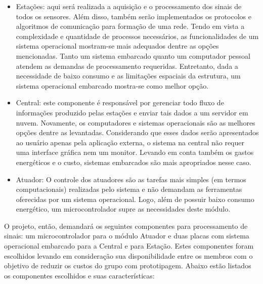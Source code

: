 		\begin{itemize}
			\item Estações: aqui será realizada a aquisição e o processamento dos sinais de todos os sensores. Além disso, também serão implementados os protocolos e algoritmos de comunicação para formação de uma rede. Tendo em vista a complexidade e quantidade de processos necessários, as funcionalidades de um sistema operacional mostram-se mais adequados dentre as opções mencionadas. Tanto um sistema embarcado quanto um computador pessoal atendem as demandas de processamento requeridas. Entretanto, dada a necessidade de baixo consumo e as limitações espaciais da estrutura, um sistema operacional embarcado mostra-se como melhor opção.   
			
			\item Central: este componente é responsável por gerenciar todo fluxo de informações produzido pelas estações e enviar tais dados a um servidor em nuvem. Novamente, os computadores e sistemas operacionais são as melhores opções dentre as levantadas. Considerando que esses dados serão apresentados ao usuário apenas pela aplicação externa, o sistema na central não requer uma interface gráfica nem um monitor. Levando em conta também os gastos energéticos e o custo, sistemas embarcados são mais apropriados nesse caso.
			
			\item Atuador: O controle dos atuadores são as tarefas mais simples (em termos computacionais) realizadas pelo sistema e não demandam as ferramentas oferecidas por um sistema operacional. Logo, além de possuir baixo consumo energético, um microcontrolador supre as necessidades deste módulo. 
				
		\end{itemize}
		
O projeto, então, demandará os seguintes componentes para processamento de sinais: um microcontrolador para o módulo Atuador e duas placas com sistema operacional embarcado para a Central e para Estação. Estes componentes foram escolhidos levando em consideração sua disponibilidade entre os membros com o objetivo de reduzir os custos do grupo com prototipagem. Abaixo estão listados os componentes escolhidos e suas características:
 
